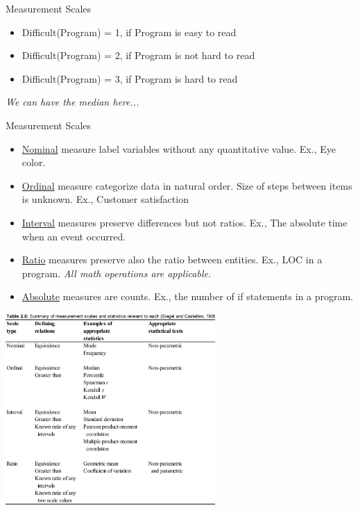 \documentclass{beamer}
\begin{document}
\begin{frame}{\centerline{Measurement Scales}}

\begin{itemize}
\item Difficult(Program) = 1, if Program is easy to read
\item Difficult(Program) = 2, if Program is not hard to read 
\item Difficult(Program) = 3, if Program is hard to read 
\end{itemize}
\textit{We can have the median here...}

\end{frame}

\begin{frame}{\centerline{Measurement Scales}}

\begin{itemize}
\item \underline{Nominal} measure label variables without any quantitative value. Ex., Eye color.
\item \underline{Ordinal} measure categorize data in natural order. Size of steps between items is unknown. Ex.,  Customer satisfaction 
\item \underline{Interval} measures preserve differences but not ratios. Ex., The absolute time when an event occurred.
\item \underline{Ratio} measures preserve also the ratio between entities. Ex., LOC in a program. \textit{All math operations are applicable.}
\item \underline{Absolute} measures are counts. Ex., the number of if statements in a program.
\end{itemize}

\end{frame}

\begin{frame}{\centerline{}}

\begin{center}
\includegraphics[width=80mm]{A2022.ScaleDeiDati/img-img15.png}
\end{center}

\end{frame}
\end{document}
